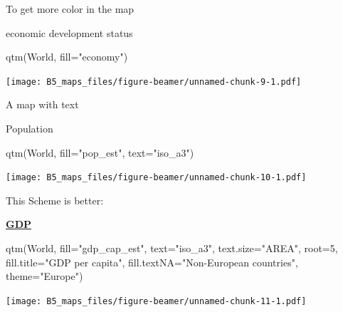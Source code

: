\documentclass[
  10pt,
  ignorenonframetext,
]{beamer}
\newenvironment{Shaded}{\begin{snugshade}}{\end{snugshade}}
\newcommand{\DataTypeTok}[1]{\textcolor[rgb]{0.87,0.87,0.75}{#1}}
\newcommand{\DecValTok}[1]{\textcolor[rgb]{0.86,0.86,0.80}{#1}}
\newcommand{\KeywordTok}[1]{\textcolor[rgb]{0.94,0.87,0.69}{#1}}
\newcommand{\NormalTok}[1]{\textcolor[rgb]{0.80,0.80,0.80}{#1}}
\newcommand{\StringTok}[1]{\textcolor[rgb]{0.80,0.58,0.58}{#1}}
\begin{document}
\begin{frame}[fragile]{To get more color in the map}
\protect\hypertarget{to-get-more-color-in-the-map}{}

\begin{block}{economic development status}

\begin{Shaded}
\begin{Highlighting}[]
\KeywordTok{qtm}\NormalTok{(World, }\DataTypeTok{fill=}\StringTok{"economy"}\NormalTok{)}
\end{Highlighting}
\end{Shaded}

\texttt{[image: B5\_maps\_files/figure-beamer/unnamed-chunk-9-1.pdf]}

\end{block}

\end{frame}

\begin{frame}[fragile]{A map with text}
\protect\hypertarget{a-map-with-text}{}

\begin{block}{Population}

\begin{Shaded}
\begin{Highlighting}[]
\KeywordTok{qtm}\NormalTok{(World, }\DataTypeTok{fill=}\StringTok{"pop_est"}\NormalTok{, }\DataTypeTok{text=}\StringTok{"iso_a3"}\NormalTok{)}
\end{Highlighting}
\end{Shaded}

\texttt{[image: B5\_maps\_files/figure-beamer/unnamed-chunk-10-1.pdf]}

\end{block}

\end{frame}

\begin{frame}[fragile]{This Scheme is better:}
\protect\hypertarget{this-scheme-is-better}{}

\begin{block}{\href{https://en.wikipedia.org/wiki/Population_density}{\textbf{GDP}}}

\begin{Shaded}
\begin{Highlighting}[]
\KeywordTok{qtm}\NormalTok{(World, }\DataTypeTok{fill=}\StringTok{"gdp_cap_est"}\NormalTok{, }\DataTypeTok{text=}\StringTok{"iso_a3"}\NormalTok{, }
    \DataTypeTok{text.size=}\StringTok{"AREA"}\NormalTok{, }\DataTypeTok{root=}\DecValTok{5}\NormalTok{, }\DataTypeTok{fill.title=}\StringTok{"GDP per capita"}\NormalTok{, }
    \DataTypeTok{fill.textNA=}\StringTok{"Non-European countries"}\NormalTok{, }\DataTypeTok{theme=}\StringTok{"Europe"}\NormalTok{)}
\end{Highlighting}
\end{Shaded}

\texttt{[image: B5\_maps\_files/figure-beamer/unnamed-chunk-11-1.pdf]}

\end{block}

\end{frame}
\end{document}

